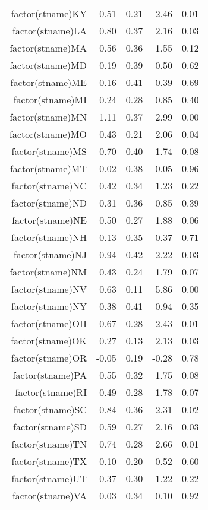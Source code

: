 \begin{table}[ht]
\begin{tabular}{rrrrr}
  factor(stname)KY & 0.51 & 0.21 & 2.46 & 0.01 \\ 
  factor(stname)LA & 0.80 & 0.37 & 2.16 & 0.03 \\ 
  factor(stname)MA & 0.56 & 0.36 & 1.55 & 0.12 \\ 
  factor(stname)MD & 0.19 & 0.39 & 0.50 & 0.62 \\ 
  factor(stname)ME & -0.16 & 0.41 & -0.39 & 0.69 \\ 
  factor(stname)MI & 0.24 & 0.28 & 0.85 & 0.40 \\ 
  factor(stname)MN & 1.11 & 0.37 & 2.99 & 0.00 \\ 
  factor(stname)MO & 0.43 & 0.21 & 2.06 & 0.04 \\ 
  factor(stname)MS & 0.70 & 0.40 & 1.74 & 0.08 \\ 
  factor(stname)MT & 0.02 & 0.38 & 0.05 & 0.96 \\ 
  factor(stname)NC & 0.42 & 0.34 & 1.23 & 0.22 \\ 
  factor(stname)ND & 0.31 & 0.36 & 0.85 & 0.39 \\ 
  factor(stname)NE & 0.50 & 0.27 & 1.88 & 0.06 \\ 
  factor(stname)NH & -0.13 & 0.35 & -0.37 & 0.71 \\ 
  factor(stname)NJ & 0.94 & 0.42 & 2.22 & 0.03 \\ 
  factor(stname)NM & 0.43 & 0.24 & 1.79 & 0.07 \\ 
  factor(stname)NV & 0.63 & 0.11 & 5.86 & 0.00 \\ 
  factor(stname)NY & 0.38 & 0.41 & 0.94 & 0.35 \\ 
  factor(stname)OH & 0.67 & 0.28 & 2.43 & 0.01 \\ 
  factor(stname)OK & 0.27 & 0.13 & 2.13 & 0.03 \\ 
  factor(stname)OR & -0.05 & 0.19 & -0.28 & 0.78 \\ 
  factor(stname)PA & 0.55 & 0.32 & 1.75 & 0.08 \\ 
  factor(stname)RI & 0.49 & 0.28 & 1.78 & 0.07 \\ 
  factor(stname)SC & 0.84 & 0.36 & 2.31 & 0.02 \\ 
  factor(stname)SD & 0.59 & 0.27 & 2.16 & 0.03 \\ 
  factor(stname)TN & 0.74 & 0.28 & 2.66 & 0.01 \\ 
  factor(stname)TX & 0.10 & 0.20 & 0.52 & 0.60 \\ 
  factor(stname)UT & 0.37 & 0.30 & 1.22 & 0.22 \\ 
  factor(stname)VA & 0.03 & 0.34 & 0.10 & 0.92 \\ 

\end{tabular}
\end{table}

